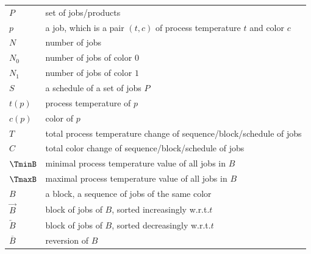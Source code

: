 \documentclass{article}
\makeatletter
\theoremstyle{definition}
\newcommand{\setJ}{P}
\newcommand{\numJ}{N}
\newcommand{\sched}{S}
\newcommand{\block}{B}
\newcommand{\job}{p}
\newcommand{\temp}{T}
\newcommand{\tempJ}{t}
\newcommand{\col}{C}
\newcommand{\colJ}{c}
\newcommand{\wrt}{w.r.t.\@\xspace}
\makeatother
\begin{document}
\small 
\renewcommand{\arraystretch}{1.5}
\setlength{\LTpre}{0pt} 
\setlength{\LTpost}{0pt} 
\begin{longtable}[l]{@{}lp{}@{}}
$\setJ$ & set of jobs/products \\
$\job$ & a job, which is a pair $(\tempJ,\colJ)$ of process temperature $\tempJ$ and color $\colJ$ \\
$\numJ$ & number of jobs \\
$\numJ_0$ & number of jobs of color $0$ \\
$\numJ_1$ & number of jobs of color $1$ \\
$\sched$ & a schedule of a set of jobs $\setJ$ \\
$\tempJ(p)$ & process temperature of $\job$ \\
$\colJ(p)$ & color of $\job$ \\
$\temp$ & total process temperature change of sequence/block/schedule of jobs \\
$\col$ & total color change of sequence/block/schedule of jobs \\
$\TminB$ & minimal process temperature value of all jobs in $\block$ \\
$\TmaxB$ & maximal process temperature value of all jobs in $\block$ \\
$\block$ & a block, a sequence of jobs of the same color \\
$\overrightarrow{\block}$ & block of jobs of $\block$, sorted increasingly \wrt $\tempJ$ \\
$\overleftarrow{\block}$ & block of jobs of $\block$, sorted decreasingly \wrt $\tempJ$ \\
$\overline{\block}$ & reversion of $\block$ 
\end{longtable}
\end{document}
